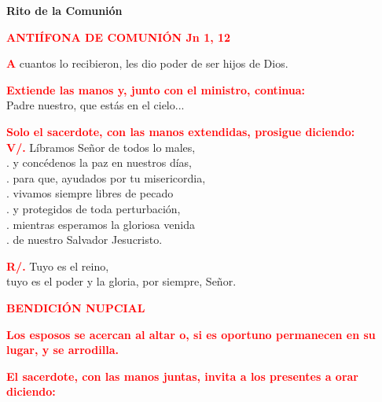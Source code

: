 \documentclass[12pt, letterpaper]{report}
\begin{document}
  \clearpage

  \begin{center}
    \Huge {\bfseries Rito de la Comuni\'on}
  \end{center}

  \Large {\bfseries \textcolor{red}{ANTI\'IFONA DE COMUNI\'ON \hspace{2cm} Jn 1, 12}}

  \lettrine[lines=1]{\bfseries \textcolor{red}{A}}{} \Large cuantos lo recibieron, les dio poder de ser hijos de Dios.

  \large{\bfseries \textcolor{red}{Extiende las manos y, junto con el ministro, continua:}}\\
  \Large Padre nuestro, que est\'as en el cielo...

  \large{\bfseries \textcolor{red}{Solo el sacerdote, con las manos extendidas, prosigue diciendo:}}\\
  \Large{\bfseries \textcolor{red}{V/.}} \hspace{0.1cm} L\'ibramos Se\~nor de todos lo males,\\
  . \hspace{1cm} y conc\'edenos la paz en nuestros d\'ias,\\
  . \hspace{1cm} para que, ayudados por tu misericordia,\\
  . \hspace{1cm} vivamos siempre libres de pecado\\
  . \hspace{1cm} y protegidos de toda perturbaci\'on,\\
  . \hspace{1cm} mientras esperamos la gloriosa venida\\
  . \hspace{1cm} de nuestro Salvador Jesucristo.

  \noindent
  \Large {\bfseries \textcolor{red}{R/.}} \hspace{0.1cm} Tuyo es el reino,\\
  tuyo es el poder y la gloria, por siempre, Se\~nor.

  \Large {\bfseries \textcolor{red}{BENDICI\'ON NUPCIAL}}

  \large{\bfseries \textcolor{red}{Los esposos se acercan al altar o,
  si es oportuno permanecen en su lugar, y se arrodilla.}}

  \large{\bfseries \textcolor{red}{El sacerdote, con las manos juntas, invita a los presentes a orar diciendo:}}
  
\end{document}
